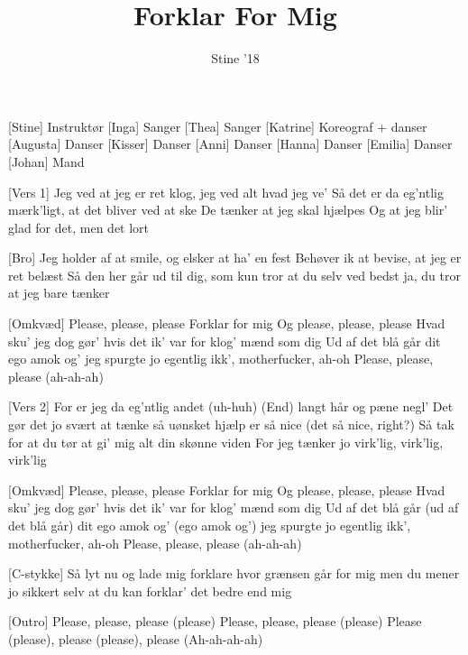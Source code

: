 \documentclass[a4paper,11pt]{article}
\title{Forklar For Mig}
\author{Stine '18}
\begin{document}
\maketitle

\begin{roles}
[Stine] Instruktør
[Inga] Sanger
[Thea] Sanger
[Katrine] Koreograf + danser
[Augusta] Danser
[Kisser] Danser
[Anni] Danser
[Hanna] Danser
[Emilia] Danser
[Johan] Mand
\end{roles}

\begin{song}
[Vers 1] Jeg ved at jeg er ret klog, 
jeg ved alt hvad jeg ve’ 
Så det er da eg’ntlig mærk’ligt, 
at det bliver ved at ske
De tænker at jeg skal hjælpes
Og at jeg blir’ glad for det,
men det lort


[Bro] Jeg holder af at smile, 
og elsker at ha’ en fest
Behøver ik at bevise, 
at jeg er ret belæst
Så den her går ud til dig, som 
kun tror at du selv ved bedst
ja, du tror
at jeg bare tænker

[Omkvæd] Please, please, please
Forklar for mig
Og please, please, please
Hvad sku’ jeg dog gør’ hvis det ik’ var for klog’ mænd som dig
Ud af det blå går
dit ego amok og’
jeg spurgte jo egentlig ikk’,
motherfucker, ah-oh
Please, please, please (ah-ah-ah)

[Vers 2] For er jeg da eg’ntlig andet (uh-huh)
(End) langt hår og pæne negl’
Det gør det jo svært at tænke
så uønsket hjælp er så nice (det så nice, right?)
Så tak for at du tør at gi’
mig alt din skønne viden
For jeg tænker jo virk’lig, virk’lig, virk’lig


[Omkvæd] Please, please, please 
Forklar for mig
Og please, please, please
Hvad sku’ jeg dog gør’ hvis det ik’ var for klog’ mænd som dig
Ud af det blå går (ud af det blå går)
dit ego amok og’ (ego amok og’)
jeg spurgte jo egentlig ikk’,
motherfucker, ah-oh
Please, please, please (ah-ah-ah)

[C-stykke] Så lyt nu og lade mig forklare hvor grænsen går for mig 
men du mener jo sikkert selv at du 
kan forklar’ det bedre end mig

[Outro] Please, please, please (please)
Please, please, please (please)
Please (please), please (please), please
(Ah-ah-ah-ah)
\end{song}
\end{document}

